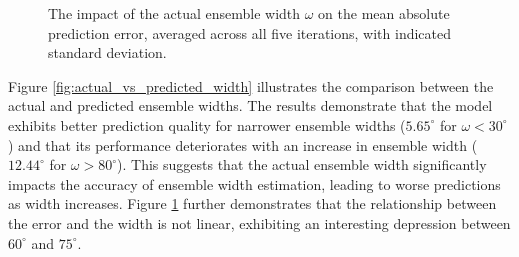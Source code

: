 \documentclass{article}
\begin{document}
\begin{figure}[ht]
\begin{minipage}[t]{0.45\linewidth}
    \caption{\label{fig:mae_width}The impact of the actual ensemble width $\omega$ on the mean absolute prediction error, averaged across all five iterations, with indicated standard deviation.}
  \end{minipage}
\end{figure}

Figure \ref{fig:actual_vs_predicted_width} illustrates the comparison between the actual and predicted ensemble widths. The results demonstrate that the model exhibits better prediction quality for narrower ensemble widths ($5.65^\circ$ for $\omega < 30^\circ$) and that its performance deteriorates with an increase in ensemble width ($12.44^\circ$ for $\omega > 80^\circ$). This suggests that the actual ensemble width significantly impacts the accuracy of ensemble width estimation, leading to worse predictions as width increases. Figure \ref{fig:mae_width} further demonstrates that the relationship between the error and the width is not linear, exhibiting an interesting depression between $60^\circ$ and $75^\circ$.
\end{document}
